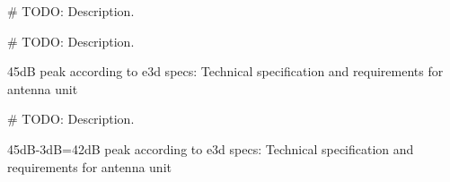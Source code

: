\documentclass[letterpaper,10pt,english]{sphinxmanual}
\begin{document}

\begin{fulllineitems}
\label{\detokenize{modules/antenna_library:antenna_library.e3d_array}}
\# TODO: Description.

\end{fulllineitems}


\begin{fulllineitems}
\label{\detokenize{modules/antenna_library:antenna_library.e3d_array_beam}}
\# TODO: Description.

45dB peak according to e3d specs: Technical specification and requirements for antenna unit

\end{fulllineitems}


\begin{fulllineitems}
\label{\detokenize{modules/antenna_library:antenna_library.e3d_array_beam_interp}}
\end{fulllineitems}


\begin{fulllineitems}
\label{\detokenize{modules/antenna_library:antenna_library.e3d_array_beam_stage1}}
\# TODO: Description.

45dB-3dB=42dB peak according to e3d specs: Technical specification and requirements for antenna unit

\end{fulllineitems}
\end{document}
